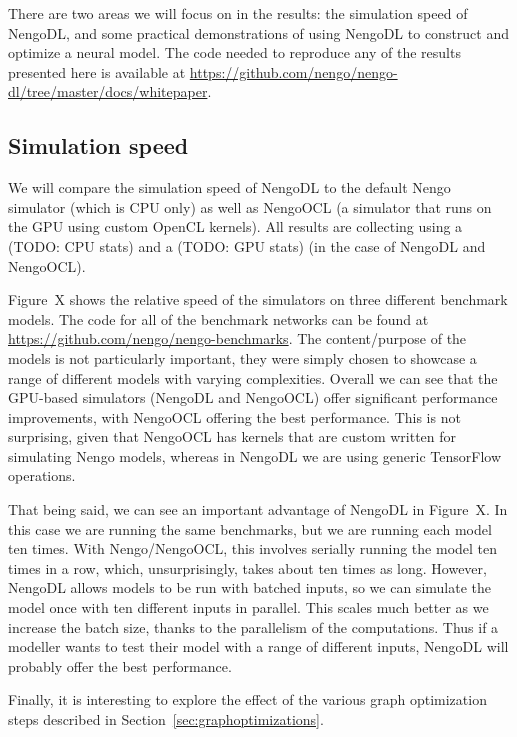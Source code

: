\documentclass{article}
\begin{document}
There are two areas we will focus on in the results: the simulation speed of NengoDL, and some practical demonstrations of using NengoDL to construct and optimize a neural model.  The code needed to reproduce any of the results presented here is available at \url{https://github.com/nengo/nengo-dl/tree/master/docs/whitepaper}. 

\subsection{Simulation speed}

We will compare the simulation speed of NengoDL to the default Nengo simulator (which is CPU only) as well as NengoOCL (a simulator that runs on the GPU using custom OpenCL kernels).  All results are collecting using a (TODO: CPU stats) and a (TODO: GPU stats) (in the case of NengoDL and NengoOCL).


Figure~X shows the relative speed of the simulators on three different benchmark models.  The code for all of the benchmark networks can be found at \url{https://github.com/nengo/nengo-benchmarks}.  The content/purpose of the models is not particularly important, they were simply chosen to showcase a range of different models with varying complexities.  Overall we can see that the GPU-based simulators (NengoDL and NengoOCL) offer significant performance improvements, with NengoOCL offering the best performance.  This is not surprising, given that NengoOCL has kernels that are custom written for simulating Nengo models, whereas in NengoDL we are using generic TensorFlow operations.


That being said, we can see an important advantage of NengoDL in Figure~X.  In this case we are running the same benchmarks, but we are running each model ten times.  With Nengo/NengoOCL, this involves serially running the model ten times in a row, which, unsurprisingly, takes about ten times as long.  However, NengoDL allows models to be run with batched inputs, so we can simulate the model once with ten different inputs in parallel.  This scales much better as we increase the batch size, thanks to the parallelism of the computations.  Thus if a modeller wants to test their model with a range of different inputs, NengoDL will probably offer the best performance.


Finally, it is interesting to explore the effect of the various graph optimization steps described in Section~\ref{sec:graphoptimizations}.
\end{document}
